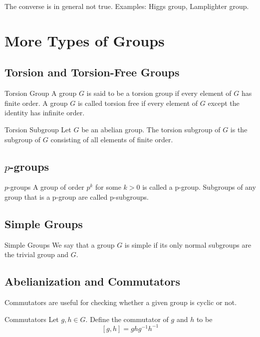 \documentclass[a4paper]{article}
\begin{document}
The converse is in general not true. Examples: Higgs group, Lamplighter group. 

\pagebreak
\section{More Types of Groups}
\subsection{Torsion and Torsion-Free Groups}
\begin{defn}{Torsion Group}{} A group $G$ is said to be a torsion group if every element of $G$ has finite order. A group $G$ is called torsion free if every element of $G$ except the identity has infinite order. 
\end{defn}

\begin{defn}{Torsion Subgroup}{} Let $G$ be an abelian group. The torsion subgroup of $G$ is the subgroup of $G$ consisting of all elements of finite order. 
\end{defn}

\subsection{$p$-groups}
\begin{defn}{$p$-groups}{} A group of order $p^k$ for some $k>0$ is called a p-group. Subgroups of any group that is a p-group are called p-subgroups. 
\end{defn}

\subsection{Simple Groups}
\begin{defn}{Simple Groups}{} We say that a group $G$ is simple if its only normal subgroups are the trivial group and $G$. 
\end{defn}

\subsection{Abelianization and Commutators}
Commutators are useful for checking whether a given group is cyclic or not. 

\begin{defn}{Commutators}{} Let $g,h\in G$. Define the commutator of $g$ and $h$ to be $$[g,h]=ghg^{-1}h^{-1}$$
\end{defn}
\end{document}
